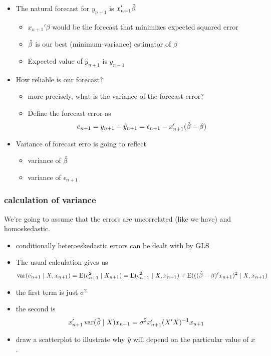 \begin{itemize}[leftmargin=0pt]
\item The natural forecast for $y_{n+1}$ is $x_{n+1}'\hat{\beta}$
\begin{itemize}
\item $x_{n+1}'\beta$ would be the forecast that minimizes expected
         squared error
\item $\hat{\beta}$ is our best (minimum-variance) estimator of $\beta$
\item Expected value of $\hat y_{n+1}$ is $y_{n+1}$
\end{itemize}
\item How reliable is our forecast?
\begin{itemize}
\item more precisely, what is the variance of the forecast error?
\item Define the forecast error as 
  \[ e_{n+1} = y_{n+1} - \hat y_{n+1} = \epsilon_{n+1} - x_{n+1}'(\hat{\beta} - \beta) \]
\end{itemize}
\item Variance of forecast erro is going to reflect
\begin{itemize}
\item variance of $\hat{\beta}$
\item variance of $\epsilon_{n+1}$
\end{itemize}
\end{itemize}

\subsubsection{calculation of variance}

     We're going to assume that the errors are uncorrelated (like we
     have) and homoskedastic.
\begin{itemize}[leftmargin=0pt]
\item conditionally heteroeskedastic errors can be dealt with by GLS
\item The usual calculation gives us
  \[ \operatorname{var}(e_{n+1} \mid X, x_{n+1}) = \operatorname{E}(e_{n+1}^2 \mid X_{n+1}) = \operatorname{E}(\epsilon_{n+1}^2
  \mid X, x_{n+1}) + \operatorname{E}(((\hat{\beta} - \beta)'x_{n+1})^2 \mid X, x_{n+1})\]
\item the first term is just $\sigma^2$
\item the second is 
  \[ x_{n+1}' \operatorname{var}(\hat{\beta} \mid X) x_{n+1} = \sigma^2 x_{n+1}'(X'X)^{-1}x_{n+1}\]
\item draw a scatterplot to illustrate why $\hat y$ will depend on
       the particular value of $x$.
\end{itemize}

